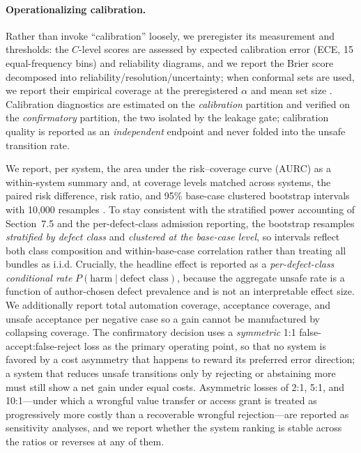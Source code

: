 \documentclass[sigconf,anonymous,review]{acmart}
\begin{document}
\paragraph{Operationalizing calibration.} Rather than invoke ``calibration'' loosely, we preregister its measurement and thresholds: the $C$-level scores are assessed by expected calibration error (ECE, 15 equal-frequency bins) \cite{guo2017calibration} and reliability diagrams, and we report the Brier score decomposed into reliability/resolution/uncertainty; when conformal sets are used, we report their empirical coverage at the preregistered $\alpha$ and mean set size \cite{vovk2005algorithmic,angelopoulos2023conformal}. Calibration diagnostics are estimated on the \emph{calibration} partition and verified on the \emph{confirmatory} partition, the two isolated by the leakage gate; calibration quality is reported as an \emph{independent} endpoint and never folded into the unsafe transition rate.

We report, per system, the area under the risk--coverage curve (AURC) as a within-system summary and, at coverage levels matched across systems, the paired risk difference, risk ratio, and 95\% base-case clustered bootstrap intervals with 10{,}000 resamples \cite{efron1994bootstrap}. To stay consistent with the stratified power accounting of Section~7.5 and the per-defect-class admission reporting, the bootstrap resamples \emph{stratified by defect class} and \emph{clustered at the base-case level}, so intervals reflect both class composition and within-base-case correlation rather than treating all bundles as i.i.d. Crucially, the headline effect is reported as a \emph{per-defect-class conditional rate} $P(\text{harm}\mid\text{defect class})$, because the aggregate unsafe rate is a function of author-chosen defect prevalence and is not an interpretable effect size. We additionally report total automation coverage, acceptance coverage, and unsafe acceptance per negative case so a gain cannot be manufactured by collapsing coverage. The confirmatory decision uses a \emph{symmetric} 1:1 false-accept:false-reject loss as the primary operating point, so that no system is favored by a cost asymmetry that happens to reward its preferred error direction; a system that reduces unsafe transitions only by rejecting or abstaining more must still show a net gain under equal costs. Asymmetric losses of 2:1, 5:1, and 10:1---under which a wrongful value transfer or access grant is treated as progressively more costly than a recoverable wrongful rejection---are reported as sensitivity analyses, and we report whether the system ranking is stable across the ratios or reverses at any of them.
\end{document}
